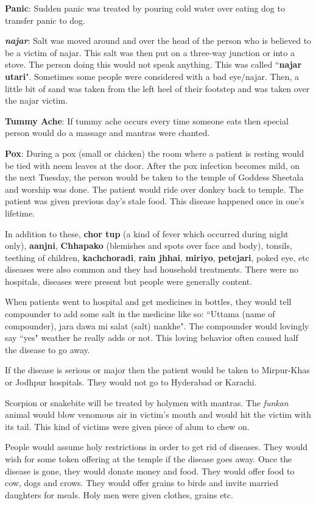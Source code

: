 \textbf{Panic}: Sudden panic was treated by pouring cold water over eating dog
to transfer panic to dog.

\textbf{\textit{najar}}: Salt was moved around and over the head of the person
who is believed to be a victim of najar. This salt was then put on a three-way
junction or into a stove. The person doing this would not speak anything. This
was called ``\textbf{najar utari}". Sometimes some people were considered with
a bad eye/najar. Then, a little bit of sand was taken from the left heel of
their footstep and was taken over the najar victim. 

\textbf{Tummy Ache}: If tummy ache occurs every time someone eats then special
person would do a massage and mantras were chanted.

\textbf{Pox}: During a pox (small or chicken) the room where a patient is
resting would be tied with neem leaves at the door. After the pox infection
becomes mild, on the next Tuesday, the person would be taken to the temple of
Goddess Sheetala and worship was done. The patient would ride over donkey back
to temple. The patient was given previous day's stale food. This disease
happened once in one's lifetime. 

In addition to these, \textbf{chor tup} (a kind of fever which occurred during
night only), \textbf{aanjni}, \textbf{Chhapako} (blemishes and spots over face
and body), tonsils, teething of children, \textbf{kachchoradi}, \textbf{rain
jhhai}, \textbf{miriyo}, \textbf{petejari}, poked eye, etc diseases were also
common and they had household treatments. There were no hospitals, diseases
were present but people were generally content.

When patients went to hospital and get medicines in bottles, they would tell
compounder to add some salt in the medicine like so: ``Uttama (name of
compounder), jara dawa mi salat (salt) nankhe". The compounder would lovingly
say ``yes" weather he really adds or not. This loving behavior often caused
half the disease to go away.

If the disease is serious or major then the patient would be taken to
Mirpur-Khas or Jodhpur hospitals. They would not go to Hyderabad or Karachi.

Scorpion or snakebite will be treated by holymen with mantras. The
\textit{funkan} animal would blow venomous air in victim's mouth and would hit
the victim with its tail. This kind of victims were given piece of alum to chew
on. 

People would assume holy restrictions in order to get rid of diseases. They
would wish for some token offering at the temple if the disease goes away. Once
the disease is gone, they would donate money and food. They would offer food to
cow, dogs and crows. They would offer grains to birds and invite married
daughters for meals. Holy men were given clothes, grains etc.

